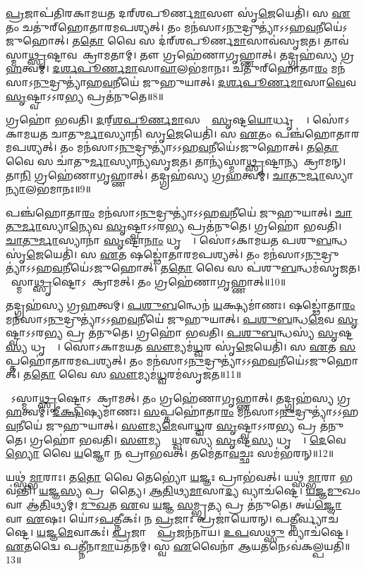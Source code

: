 \ul{𑌪𑍍𑌰}𑌜𑌾𑌪॑𑌤𑌿𑌰𑌕𑌾𑌮𑌯𑌤 𑌦𑌰𑍍‌\mbox{}𑌶𑌪𑍂𑌰𑍍𑌣\ul{𑌮𑌾}𑌸𑍗 𑌸𑍃॑\ul{𑌜𑍇}𑌯𑍇𑌤𑌿॑।
𑌸 \ul{𑌏}𑌤𑌂  𑌚𑌤𑍁॑𑌰𑍍‌\mbox{}𑌹𑍋𑌤𑌾𑌰𑌮𑌪𑌶𑍍𑌯𑌤𑍍।
𑌤𑌂 𑌮𑌨॑𑌸𑌾\-𑌽\ul{𑌨𑍁}𑌦𑍍𑌰𑍁𑌤𑍍𑌯𑌾॑\-𑌽𑌽𑌹\ul{𑌵}𑌨𑍀𑌯𑍇॑\-𑌽𑌜𑍁𑌹𑍋𑌤𑍍।
𑌤\ul{𑌤𑍋} 𑌵𑍈 𑌸 𑌦॑𑌰𑍍‌\mbox{}𑌶𑌪𑍂𑌰𑍍𑌣\ul{𑌮𑌾}𑌸𑌾𑌵॑𑌸𑍃𑌜𑌤।
𑌤𑌾𑌵॑𑌸𑍍𑌮𑌾\ul{𑌥𑍍𑌸𑍃}𑌷𑍍𑌟𑌾𑌵𑌪𑌾᳚\-𑌕𑍍𑌰𑌾𑌮𑌤𑌾𑌮𑍍।
𑌤𑍗 𑌗𑍍𑌰𑌹𑍇॑𑌣𑌾𑌗𑍃𑌹𑍍𑌣𑌾𑌤𑍍।
𑌤𑌦𑍍𑌗𑍍𑌰𑌹॑𑌸𑍍𑌯 𑌗𑍍𑌰\ul{𑌹}𑌤𑍍𑌵𑌮𑍍।
\ul{𑌦}\ul{𑌰𑍍𑌶}\ul{𑌪𑍂}\ul{𑌰𑍍𑌣}\ul{𑌮𑌾}𑌸𑌾\ul{𑌵𑌾}𑌲𑌭॑𑌮𑌾𑌨𑌃।
𑌚𑌤𑍁॑𑌰𑍍‌\mbox{}𑌹𑍋𑌤𑌾\ul{𑌰𑌂} 𑌮𑌨॑𑌸𑌾\-𑌽\ul{𑌨𑍁}𑌦𑍍𑌰𑍁𑌤𑍍𑌯𑌾॑\-𑌹\ul{𑌵}𑌨𑍀𑌯𑍇॑ 𑌜𑍁𑌹𑍁𑌯𑌾𑌤𑍍।
\ul{𑌦}\ul{𑌰𑍍𑌶}\ul{𑌪𑍂}\ul{𑌰𑍍𑌣}\ul{𑌮𑌾}𑌸𑌾\ul{𑌵𑍇}𑌵 \ul{𑌸𑍃}𑌷𑍍𑌟𑍍𑌵𑌾\-𑌽𑌽𑌰\ul{𑌭𑍍𑌯} 𑌪𑍍𑌰𑌤॑𑌨𑍁𑌤𑍇॥8॥

𑌗𑍍𑌰𑌹𑍋॑ 𑌭𑌵𑌤𑌿।
\ul{𑌦}𑌰𑍍‌॒\mbox{}\ul{𑌶}\ul{𑌪𑍂}\ul{𑌰𑍍𑌣}\ul{𑌮𑌾}𑌸𑌯𑍋𑌃᳚ \ul{𑌸𑍃}𑌷𑍍𑌟\ul{𑌯𑍋}𑌰𑍍𑌧𑍃𑌤𑍍𑌯𑍈᳚।
𑌸𑍋॑𑌽𑌕𑌾𑌮𑌯𑌤 𑌚𑌾𑌤𑍁\ul{𑌰𑍍𑌮𑌾}𑌸𑍍𑌯𑌾𑌨𑌿॑ 𑌸𑍃\ul{𑌜𑍇}𑌯𑍇𑌤𑌿॑।
𑌸 \ul{𑌏}𑌤𑌂 𑌪𑌞𑍍𑌚॑𑌹𑍋𑌤𑌾𑌰𑌮𑌪𑌶𑍍𑌯𑌤𑍍।
𑌤𑌂 𑌮𑌨॑𑌸𑌾\-𑌽\ul{𑌨𑍁}𑌦𑍍𑌰𑍁𑌤𑍍𑌯𑌾॑\-𑌽𑌽𑌹\ul{𑌵}𑌨𑍀𑌯𑍇॑\-𑌽𑌜𑍁𑌹𑍋𑌤𑍍।
𑌤\ul{𑌤𑍋} 𑌵𑍈 𑌸 𑌚𑌾॑𑌤𑍁\ul{𑌰𑍍𑌮𑌾}𑌸𑍍𑌯𑌾𑌨𑍍𑌯॑𑌸𑍃𑌜𑌤।
𑌤𑌾𑌨𑍍𑌯॑𑌸𑍍𑌮𑌾\ul{𑌥𑍍𑌸𑍃}𑌷𑍍𑌟𑌾𑌨𑍍𑌯𑌪𑌾᳚𑌕𑍍𑌰𑌾𑌮𑌨𑍍।
𑌤𑌾\ul{𑌨𑌿} 𑌗𑍍𑌰𑌹𑍇॑𑌣𑌾𑌗𑍃𑌹𑍍𑌣𑌾𑌤𑍍।
𑌤𑌦𑍍𑌗𑍍𑌰𑌹॑𑌸𑍍𑌯 𑌗𑍍𑌰\ul{𑌹}𑌤𑍍𑌵𑌮𑍍।
\ul{𑌚𑌾}\ul{𑌤𑍁}\ul{𑌰𑍍𑌮𑌾}𑌸𑍍𑌯𑌾\ul{𑌨𑍍𑌯𑌾}𑌲𑌭॑𑌮𑌾𑌨𑌃॥9॥

𑌪𑌞𑍍𑌚॑𑌹𑍋𑌤𑌾\ul{𑌰𑌂} 𑌮𑌨॑𑌸𑌾\-𑌽\ul{𑌨𑍁}𑌦𑍍𑌰𑍁𑌤𑍍𑌯𑌾॑\-𑌽𑌽𑌹\ul{𑌵}𑌨𑍀𑌯𑍇॑ 𑌜𑍁𑌹𑍁𑌯𑌾𑌤𑍍।
\ul{𑌚𑌾}\ul{𑌤𑍁}\ul{𑌰𑍍𑌮𑌾}𑌸𑍍𑌯𑌾\-\ul{𑌨𑍍𑌯𑍇}𑌵 \ul{𑌸𑍃}𑌷𑍍𑌟𑍍𑌵𑌾\-𑌽𑌽𑌰\ul{𑌭𑍍𑌯} 𑌪𑍍𑌰𑌤॑𑌨𑍁𑌤𑍇।
𑌗𑍍𑌰𑌹𑍋॑ 𑌭𑌵𑌤𑌿।
\ul{𑌚𑌾}\ul{𑌤𑍁}\ul{𑌰𑍍𑌮𑌾}𑌸𑍍𑌯𑌾𑌨𑌾॑ \ul{𑌸𑍃}𑌷𑍍𑌟𑌾\ul{𑌨𑌾𑌂} 𑌧𑍃𑌤𑍍𑌯𑍈᳚।
𑌸𑍋॑𑌽𑌕𑌾𑌮𑌯𑌤 𑌪𑌶𑍁\ul{𑌬}𑌨𑍍𑌧 𑌸𑍃॑\ul{𑌜𑍇}𑌯𑍇𑌤𑌿॑।
𑌸 \ul{𑌏}𑌤 𑌷𑌡𑍍𑌢𑍋॑𑌤𑌾𑌰𑌮𑌪𑌶𑍍𑌯𑌤𑍍।
𑌤𑌂 𑌮𑌨॑𑌸𑌾\-𑌽\ul{𑌨𑍁}𑌦𑍍𑌰𑍁𑌤𑍍𑌯𑌾॑\-𑌽𑌽𑌹\ul{𑌵}𑌨𑍀𑌯𑍇॑\-𑌽𑌜𑍁𑌹𑍋𑌤𑍍।
𑌤\ul{𑌤𑍋} 𑌵𑍈 𑌸 𑌪॑𑌶𑍁\ul{𑌬}𑌨𑍍𑌧𑌮॑𑌸𑍃𑌜𑌤।
𑌸𑍋᳚𑌸𑍍𑌮𑌾\ul{𑌥𑍍𑌸𑍃}𑌷𑍍𑌟𑍋\-𑌽𑌪𑌾᳚𑌕𑍍𑌰𑌾𑌮𑌤𑍍।
𑌤𑌂 𑌗𑍍𑌰𑌹𑍇॑𑌣𑌾𑌗𑍃𑌹𑍍𑌣𑌾𑌤𑍍॥10॥

𑌤𑌦𑍍𑌗𑍍𑌰𑌹॑𑌸𑍍𑌯 𑌗𑍍𑌰\ul{𑌹}𑌤𑍍𑌵𑌮𑍍।
\ul{𑌪}\ul{𑌶𑍁}\ul{𑌬}𑌨𑍍𑌧𑍇𑌨॑ \ul{𑌯}𑌕𑍍𑌷𑍍𑌯𑌮𑌾॑𑌣𑌃।
𑌷𑌡𑍍𑌢𑍋॑𑌤𑌾\ul{𑌰𑌂} 𑌮𑌨॑𑌸𑌾\-𑌽\ul{𑌨𑍁}𑌦𑍍𑌰𑍁𑌤𑍍𑌯𑌾॑\-𑌽𑌽𑌹\ul{𑌵}𑌨𑍀𑌯𑍇॑ 𑌜𑍁𑌹𑍁𑌯𑌾𑌤𑍍।
\ul{𑌪}\ul{𑌶𑍁}\ul{𑌬}𑌨𑍍𑌧\ul{𑌮𑍇}𑌵 \ul{𑌸𑍃}𑌷𑍍𑌟𑍍𑌵𑌾\-𑌽𑌽𑌰\ul{𑌭𑍍𑌯} 𑌪𑍍𑌰 𑌤॑𑌨𑍁𑌤𑍇।
𑌗𑍍𑌰𑌹𑍋॑ 𑌭𑌵𑌤𑌿।
\ul{𑌪}\ul{𑌶𑍁}\ul{𑌬}𑌨𑍍𑌧𑌸𑍍𑌯॑ \ul{𑌸𑍃}𑌷𑍍𑌟\ul{𑌸𑍍𑌯} 𑌧𑍃𑌤𑍍𑌯𑍈᳚।
𑌸𑍋॑𑌽𑌕𑌾𑌮𑌯𑌤 \ul{𑌸𑍗}𑌮𑍍𑌯𑌮॑\ul{𑌧𑍍𑌵}𑌰 𑌸𑍃॑\ul{𑌜𑍇}𑌯𑍇𑌤𑌿॑।
𑌸 \ul{𑌏}𑌤 \ul{𑌸}𑌪𑍍𑌤𑌹𑍋॑𑌤𑌾𑌰𑌮𑌪𑌶𑍍𑌯𑌤𑍍।
𑌤𑌂 𑌮𑌨॑𑌸𑌾\-𑌽\ul{𑌨𑍁}𑌦𑍍𑌰𑍁𑌤𑍍𑌯𑌾॑\-𑌽𑌽𑌹\ul{𑌵}𑌨𑍀𑌯𑍇॑\-𑌽𑌜𑍁𑌹𑍋𑌤𑍍।
𑌤\ul{𑌤𑍋} 𑌵𑍈 𑌸 \ul{𑌸𑍗}𑌮𑍍𑌯𑌮॑\ul{𑌧𑍍𑌵}𑌰𑌮॑𑌸𑍃𑌜𑌤॥11॥

𑌸𑍋᳚𑌽𑌸𑍍𑌮𑌾\ul{𑌥𑍍𑌸𑍃}𑌷𑍍𑌟𑍋\-𑌽𑌪𑌾᳚𑌕𑍍𑌰𑌾𑌮𑌤𑍍।
𑌤𑌂 𑌗𑍍𑌰𑌹𑍇॑𑌣𑌾𑌗𑍃𑌹𑍍𑌣𑌾𑌤𑍍।
𑌤𑌦𑍍𑌗𑍍𑌰𑌹॑𑌸𑍍𑌯 𑌗𑍍𑌰\ul{𑌹}𑌤𑍍𑌵𑌮𑍍।
\ul{𑌦𑍀}\ul{𑌕𑍍𑌷𑌿}𑌷𑍍𑌯𑌮𑌾॑𑌣𑌃।
\ul{𑌸}𑌪𑍍𑌤𑌹𑍋॑𑌤𑌾\ul{𑌰𑌂} 𑌮𑌨॑𑌸𑌾\-𑌽\ul{𑌨𑍁}𑌦𑍍𑌰𑍁𑌤𑍍𑌯𑌾॑\-𑌽𑌽𑌹\ul{𑌵}𑌨𑍀𑌯𑍇॑ 𑌜𑍁𑌹𑍁𑌯𑌾𑌤𑍍।
\ul{𑌸𑍗}𑌮𑍍𑌯\ul{𑌮𑍇}𑌵𑌾\ul{𑌧𑍍𑌵}𑌰 \ul{𑌸𑍃}𑌷𑍍𑌟𑍍𑌵𑌾\-𑌽𑌽𑌰\ul{𑌭𑍍𑌯} 𑌪𑍍𑌰 𑌤॑𑌨𑍁𑌤𑍇।
𑌗𑍍𑌰𑌹𑍋॑ 𑌭𑌵𑌤𑌿।
\ul{𑌸𑍗}𑌮𑍍𑌯𑌸𑍍𑌯𑌾᳚\ul{𑌧𑍍𑌵}𑌰𑌸𑍍𑌯॑ \ul{𑌸𑍃}𑌷𑍍𑌟\ul{𑌸𑍍𑌯} 𑌧𑍃𑌤𑍍𑌯𑍈᳚।
\ul{𑌦𑍇}𑌵𑍇\ul{𑌭𑍍𑌯𑍋} 𑌵𑍈 \ul{𑌯}𑌜𑍍𑌞𑍋 𑌨 𑌪𑍍𑌰𑌾𑌭॑𑌵𑌤𑍍।
𑌤𑌮𑍇॑𑌤𑌾\ul{𑌵}𑌚𑍍𑌛𑌃 𑌸𑌮॑𑌭𑌰𑌨𑍍॥12॥

𑌯𑌥𑍍𑌸॑\ul{𑌮𑍍𑌭𑌾}𑌰𑌾𑌃।
𑌤\ul{𑌤𑍋} 𑌵𑍈 𑌤𑍇𑌭𑍍𑌯𑍋॑ \ul{𑌯}𑌜𑍍𑌞𑌃 𑌪𑍍𑌰𑌾𑌭॑𑌵𑌤𑍍।
𑌯𑌥𑍍𑌸॑\ul{𑌮𑍍𑌭𑌾}𑌰𑌾 𑌭𑌵॑𑌨𑍍𑌤𑌿।
\ul{𑌯}𑌜𑍍𑌞\ul{𑌸𑍍𑌯} 𑌪𑍍𑌰𑌭𑍂᳚𑌤𑍍𑌯𑍈।
\ul{𑌆}\ul{𑌤𑌿}𑌥𑍍𑌯\ul{𑌮𑌾}𑌸𑌾\ul{𑌦𑍍𑌯} 𑌵𑍍𑌯𑌾𑌚॑𑌷𑍍𑌟𑍇।
\ul{𑌯}\ul{𑌜𑍍𑌞}\ul{𑌮𑍁}𑌖𑌂 𑌵𑌾 𑌆॑\ul{𑌤𑌿}𑌥𑍍𑌯𑌮𑍍।
\ul{𑌮𑍁}\ul{𑌖}𑌤 \ul{𑌏}𑌵 \ul{𑌯}𑌜𑍍𑌞 \ul{𑌸}𑌮𑍍𑌭𑍃\ul{𑌤𑍍𑌯} 𑌪𑍍𑌰 𑌤॑𑌨𑍁𑌤𑍇।
𑌅𑌯॑\ul{𑌜𑍍𑌞𑍋} 𑌵𑌾 \ul{𑌏}𑌷𑌃।
𑌯𑍋॑𑌽\ul{𑌪}𑌤𑍍𑌨𑍀𑌕𑌃॑।
𑌨 \ul{𑌪𑍍𑌰}𑌜𑌾𑌃 𑌪𑍍𑌰𑌜𑌾॑𑌯𑍇𑌰𑌨𑍍।
𑌪\ul{𑌤𑍍𑌨𑍀}𑌰𑍍𑌵𑍍𑌯𑌾𑌚॑𑌷𑍍𑌟𑍇।
\ul{𑌯}𑌜𑍍𑌞\ul{𑌮𑍇}𑌵𑌾𑌕𑌃॑।
\ul{𑌪𑍍𑌰}𑌜𑌾𑌨𑌾𑌂᳚ \ul{𑌪𑍍𑌰}𑌜𑌨॑𑌨𑌾𑌯।
\ul{𑌉}\ul{𑌪}𑌸\ul{𑌥𑍍𑌸𑍁} 𑌵𑍍𑌯𑌾𑌚॑𑌷𑍍𑌟𑍇।
\ul{𑌏}𑌤𑌦𑍍𑌵𑍈 𑌪𑌤𑍍𑌨𑍀॑𑌨𑌾\ul{𑌮𑌾}𑌯𑌤॑𑌨𑌮𑍍।
𑌸𑍍𑌵 \ul{𑌏}𑌵𑍈𑌨𑌾॑ \ul{𑌆}𑌯\ul{𑌤}𑌨𑍇\-𑌽𑌵॑𑌕𑌲𑍍𑌪𑌯𑌤𑌿॥13॥\anuvakamend[\ul{𑌤}\ul{𑌨𑍁}\ul{𑌤} \ul{𑌆}𑌲𑌭॑𑌮𑌾𑌨𑍋\-𑌽𑌗𑍃𑌹𑍍𑌣𑌾𑌦𑌸𑍃𑌜𑌤𑌾𑌭𑌰𑌞𑍍𑌜𑌾𑌯𑍇\ul{𑌰}𑌨𑍍𑌥𑍍𑌷𑌟𑍍𑌚॑]

